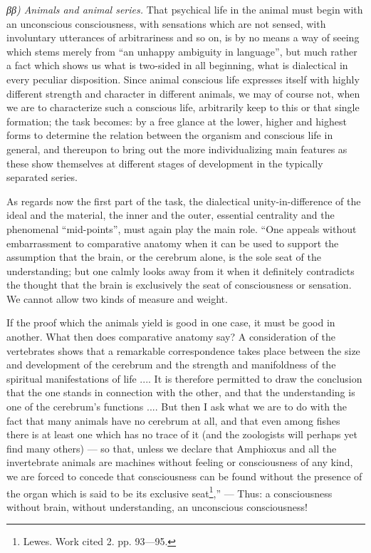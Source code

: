 \documentclass[12pt,a4paper]{book}
\begin{document}
\emph{ββ) Animals and animal series.} That psychical life in the animal must begin
with an unconscious consciousness, with sensations which are not sensed, with
involuntary utterances of arbitrariness and so on, is by no means a way of seeing
which stems merely from ``an unhappy ambiguity in language'', but much rather a fact
which shows us what is two-sided in all beginning, what is dialectical in every
peculiar disposition. Since animal conscious life expresses itself with highly
different strength and character in different animals, we may of course not, when we
are to characterize such a conscious life, arbitrarily keep to this or that single
formation; the task becomes: by a free glance at the lower, higher and highest forms
to determine the relation between the organism and conscious life in general, and
thereupon to bring out the more individualizing main features as these show
themselves at different stages of development in the typically separated series.

As regards now the first part of the task, the dialectical unity-in-difference of
the ideal and the material, the inner and the outer, essential centrality and the
phenomenal ``mid-points'', must again play the main role. ``One appeals without
embarrassment to comparative anatomy when it can be used to support the assumption
that the brain, or the cerebrum alone, is the sole seat of the understanding; but one
calmly looks away from it when it definitely contradicts the thought that the brain
is exclusively the seat of consciousness or sensation. We cannot allow two kinds of
measure and weight.

\setcounter{footnote}{0}
If the proof which the animals yield is good in one case, it must be good in
another. What then does comparative anatomy say? A consideration of the vertebrates
shows that a remarkable correspondence takes place between the size and development
of the cerebrum and the strength and manifoldness of the spiritual manifestations of
life .... It is therefore permitted to draw the conclusion that the one stands in
connection with the other, and that the understanding is one of the cerebrum's
functions .... But then I ask what we are to do with the fact that many animals have
no cerebrum at all, and that even among fishes there is at least one which has no
trace of it (and the zoologists will perhaps yet find many others) --- so that,
unless we declare that Amphioxus and all the invertebrate animals are machines
without feeling or consciousness of any kind, we are forced to concede that
consciousness can be found without the presence of the organ which is said to be its
exclusive seat\footnote{Lewes. Work cited 2. pp. 93---95.},'' --- Thus: a
consciousness without brain, without understanding, an unconscious consciousness!
\end{document}
